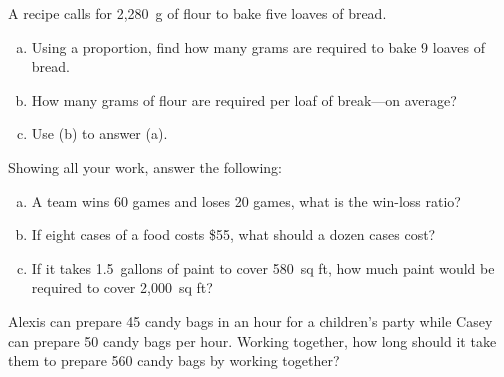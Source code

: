 \documentclass[11pt,letterpaper]{article}
\begin{document}

 A recipe calls for 2,280~g of flour to bake five loaves of bread. 
	\begin{enumerate}[(a)]
	\item Using a proportion, find how many grams are required to bake 9 loaves of bread.
	\item How many grams of flour are required per loaf of break---on average?
	\item Use (b) to answer (a). 
	\end{enumerate}



\newpage



 Showing all your work, answer the following:
	\begin{enumerate}[(a)]
	\item A team wins 60 games and loses 20 games, what is the win-loss ratio?
	\item If eight cases of a food costs \$55, what should a dozen cases cost?
	\item If it takes 1.5~gallons of paint to cover 580~sq ft, how much paint would be required to cover 2,000~sq ft?
	\end{enumerate}



\newpage



 Alexis can prepare 45 candy bags in an hour for a children's party while Casey can prepare 50 candy bags per hour. Working together, how long should it take them to prepare 560 candy bags by working together? 
\end{document}
